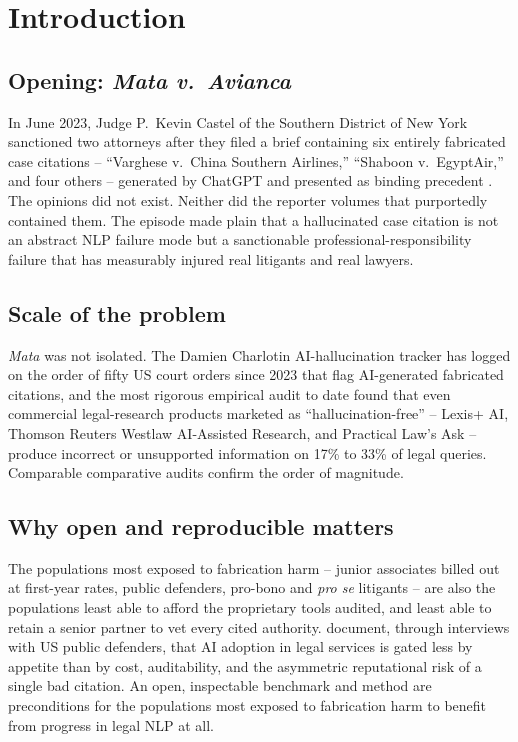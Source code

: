 \documentclass[11pt]{article}
\begin{document}
\section{Introduction}
\label{sec:intro}

\subsection{Opening: \emph{Mata v.\ Avianca}}
\label{sec:intro:mata}

In June 2023, Judge P.~Kevin Castel of the Southern District of New
York sanctioned two attorneys after they filed a brief containing six
entirely fabricated case citations -- ``Varghese v.\ China Southern
Airlines,'' ``Shaboon v.\ EgyptAir,'' and four others -- generated by
ChatGPT and presented as binding precedent
\citep{mata2023}. The opinions did not exist. Neither did the
reporter volumes that purportedly contained them. The episode made
plain that a hallucinated case citation is not an abstract NLP failure
mode but a sanctionable professional-responsibility failure that has
measurably injured real litigants and real lawyers.

\subsection{Scale of the problem}
\label{sec:intro:scale}

\emph{Mata} was not isolated. The Damien Charlotin AI-hallucination
tracker \citep{charlotin2025tracker} has logged on the order of fifty
US court orders since 2023 that flag AI-generated fabricated
citations, and the most rigorous empirical audit to date
\citep{magesh2025hallucination} found that even commercial
legal-research products marketed as ``hallucination-free'' --
Lexis+ AI, Thomson Reuters Westlaw AI-Assisted Research, and Practical
Law's Ask -- produce incorrect or unsupported information on 17\% to
33\% of legal queries. Comparable comparative audits
\citep{munir2025evaluating} confirm the order of magnitude.

\subsection{Why open and reproducible matters}
\label{sec:intro:open}

The populations most exposed to fabrication harm -- junior associates
billed out at first-year rates, public defenders, pro-bono and
\emph{pro se} litigants -- are also the populations least able to
afford the proprietary tools \citet{magesh2025hallucination} audited,
and least able to retain a senior partner to vet every cited
authority. \citet{cheong2025publicdefenders} document, through
interviews with US public defenders, that AI adoption in legal
services is gated less by appetite than by cost, auditability, and the
asymmetric reputational risk of a single bad citation. An open,
inspectable benchmark and method are preconditions for the populations
most exposed to fabrication harm to benefit from progress in
legal NLP at all.
\end{document}
